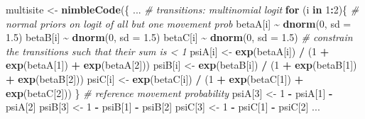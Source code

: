 \documentclass[
  12pt,
]{krantz}
\newenvironment{Shaded}{\begin{snugshade}}{\end{snugshade}}
\newcommand{\AttributeTok}[1]{\textcolor[rgb]{0.13,0.29,0.53}{#1}}
\newcommand{\CommentTok}[1]{\textcolor[rgb]{0.56,0.35,0.01}{\textit{#1}}}
\newcommand{\ControlFlowTok}[1]{\textcolor[rgb]{0.13,0.29,0.53}{\textbf{#1}}}
\newcommand{\DecValTok}[1]{\textcolor[rgb]{0.00,0.00,0.81}{#1}}
\newcommand{\FloatTok}[1]{\textcolor[rgb]{0.00,0.00,0.81}{#1}}
\newcommand{\FunctionTok}[1]{\textcolor[rgb]{0.13,0.29,0.53}{\textbf{#1}}}
\newcommand{\NormalTok}[1]{#1}
\newcommand{\OtherTok}[1]{\textcolor[rgb]{0.56,0.35,0.01}{#1}}
\newcommand{\SpecialCharTok}[1]{\textcolor[rgb]{0.81,0.36,0.00}{\textbf{#1}}}
\begin{document}
\begin{Shaded}
\begin{Highlighting}[]
\NormalTok{multisite }\OtherTok{\textless{}{-}} \FunctionTok{nimbleCode}\NormalTok{(\{}
\NormalTok{...}
  \CommentTok{\# transitions: multinomial logit}
  \ControlFlowTok{for}\NormalTok{ (i }\ControlFlowTok{in} \DecValTok{1}\SpecialCharTok{:}\DecValTok{2}\NormalTok{)\{}
  \CommentTok{\# normal priors on logit of all but one movement prob}
\NormalTok{    betaA[i] }\SpecialCharTok{\textasciitilde{}} \FunctionTok{dnorm}\NormalTok{(}\DecValTok{0}\NormalTok{, }\AttributeTok{sd =} \FloatTok{1.5}\NormalTok{)}
\NormalTok{    betaB[i] }\SpecialCharTok{\textasciitilde{}} \FunctionTok{dnorm}\NormalTok{(}\DecValTok{0}\NormalTok{, }\AttributeTok{sd =} \FloatTok{1.5}\NormalTok{)}
\NormalTok{    betaC[i] }\SpecialCharTok{\textasciitilde{}} \FunctionTok{dnorm}\NormalTok{(}\DecValTok{0}\NormalTok{, }\AttributeTok{sd =} \FloatTok{1.5}\NormalTok{)}
  \CommentTok{\# constrain the transitions such that their sum is \textless{} 1}
\NormalTok{    psiA[i] }\OtherTok{\textless{}{-}} \FunctionTok{exp}\NormalTok{(betaA[i]) }\SpecialCharTok{/}\NormalTok{ (}\DecValTok{1} \SpecialCharTok{+} \FunctionTok{exp}\NormalTok{(betaA[}\DecValTok{1}\NormalTok{]) }\SpecialCharTok{+} \FunctionTok{exp}\NormalTok{(betaA[}\DecValTok{2}\NormalTok{]))}
\NormalTok{    psiB[i] }\OtherTok{\textless{}{-}} \FunctionTok{exp}\NormalTok{(betaB[i]) }\SpecialCharTok{/}\NormalTok{ (}\DecValTok{1} \SpecialCharTok{+} \FunctionTok{exp}\NormalTok{(betaB[}\DecValTok{1}\NormalTok{]) }\SpecialCharTok{+} \FunctionTok{exp}\NormalTok{(betaB[}\DecValTok{2}\NormalTok{]))}
\NormalTok{    psiC[i] }\OtherTok{\textless{}{-}} \FunctionTok{exp}\NormalTok{(betaC[i]) }\SpecialCharTok{/}\NormalTok{ (}\DecValTok{1} \SpecialCharTok{+} \FunctionTok{exp}\NormalTok{(betaC[}\DecValTok{1}\NormalTok{]) }\SpecialCharTok{+} \FunctionTok{exp}\NormalTok{(betaC[}\DecValTok{2}\NormalTok{]))}
\NormalTok{  \}}
  \CommentTok{\# reference movement probability}
\NormalTok{  psiA[}\DecValTok{3}\NormalTok{] }\OtherTok{\textless{}{-}} \DecValTok{1} \SpecialCharTok{{-}}\NormalTok{ psiA[}\DecValTok{1}\NormalTok{] }\SpecialCharTok{{-}}\NormalTok{ psiA[}\DecValTok{2}\NormalTok{]}
\NormalTok{  psiB[}\DecValTok{3}\NormalTok{] }\OtherTok{\textless{}{-}} \DecValTok{1} \SpecialCharTok{{-}}\NormalTok{ psiB[}\DecValTok{1}\NormalTok{] }\SpecialCharTok{{-}}\NormalTok{ psiB[}\DecValTok{2}\NormalTok{]}
\NormalTok{  psiC[}\DecValTok{3}\NormalTok{] }\OtherTok{\textless{}{-}} \DecValTok{1} \SpecialCharTok{{-}}\NormalTok{ psiC[}\DecValTok{1}\NormalTok{] }\SpecialCharTok{{-}}\NormalTok{ psiC[}\DecValTok{2}\NormalTok{]}
\NormalTok{...}
\end{Highlighting}
\end{Shaded}
\end{document}
